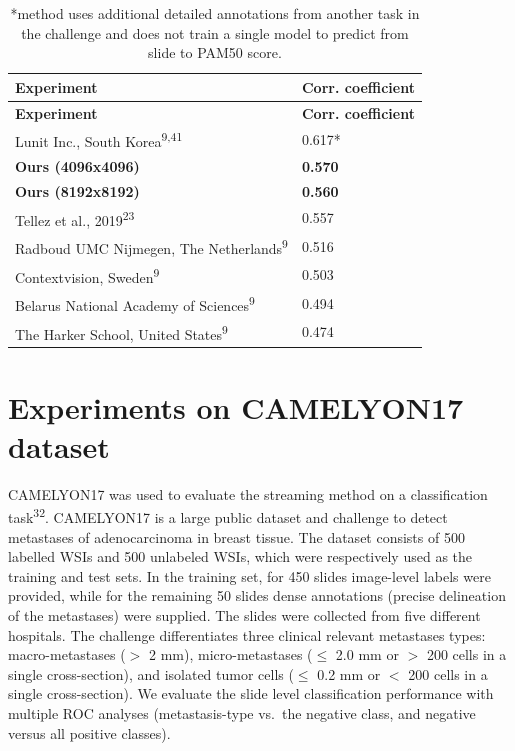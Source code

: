 \documentclass[
  12pt,
  a5,margin=2cmpaper,
]{article}
\begin{document}
\hypertarget{tab:tupacleaderboard}{}
\begin{longtable}[]{@{}ll@{}}
\caption{*method uses additional detailed annotations from another task
in the challenge and does not train a single model to predict from slide
to PAM50 score.}\tabularnewline
\toprule\noalign{}
\textbf{Experiment} & \textbf{Corr. coefficient} \\
\midrule\noalign{}
\endfirsthead
\toprule\noalign{}
\textbf{Experiment} & \textbf{Corr. coefficient} \\
\midrule\noalign{}
\endhead
\bottomrule\noalign{}
\endlastfoot
Lunit Inc., South Korea\textsuperscript{9,41} & 0.617* \\
\textbf{Ours (4096x4096)} & \textbf{0.570} \\
\textbf{Ours (8192x8192)} & \textbf{0.560} \\
Tellez et al., 2019\textsuperscript{23} & 0.557 \\
Radboud UMC Nijmegen, The Netherlands\textsuperscript{9} & 0.516 \\
Contextvision, Sweden\textsuperscript{9} & 0.503 \\
Belarus National Academy of Sciences\textsuperscript{9} & 0.494 \\
The Harker School, United States\textsuperscript{9} & 0.474 \\
\end{longtable}

\hypertarget{section:camyleon}{%
\section{Experiments on CAMELYON17 dataset}\label{section:camyleon}}

CAMELYON17 was used to evaluate the streaming method on a classification
task\textsuperscript{32}. CAMELYON17 is a large public dataset and
challenge to detect metastases of adenocarcinoma in breast tissue. The
dataset consists of 500 labelled WSIs and 500 unlabeled WSIs, which were
respectively used as the training and test sets. In the training set,
for 450 slides image-level labels were provided, while for the remaining
50 slides dense annotations (precise delineation of the metastases) were
supplied. The slides were collected from five different hospitals. The
challenge differentiates three clinical relevant metastases types:
macro-metastases (\(>\) 2 mm), micro-metastases (\(\leq\) 2.0 mm or
\(>\) 200 cells in a single cross-section), and isolated tumor cells
(\(\leq\) 0.2 mm or \(<\) 200 cells in a single cross-section). We
evaluate the slide level classification performance with multiple ROC
analyses (metastasis-type vs.~the negative class, and negative versus
all positive classes).
\end{document}
